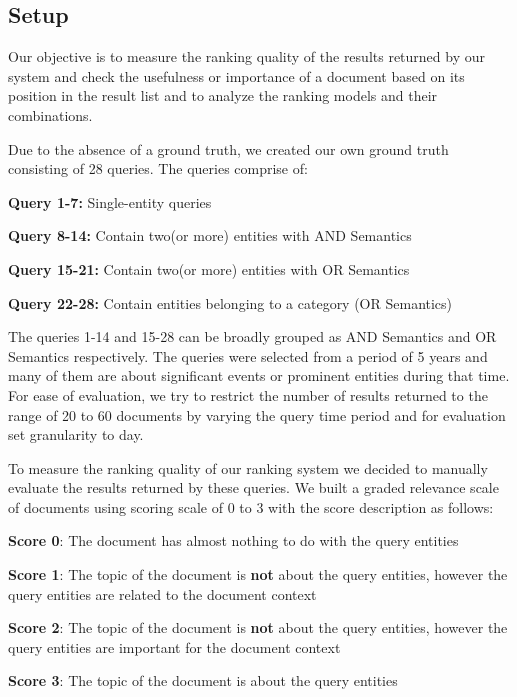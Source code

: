 
\subsection{Setup}
Our objective is to measure the ranking quality of the results
returned by our system and check the usefulness or importance
of a document based on its position in the result list and
to analyze the ranking models and their combinations.

\vskip 0.15in
\noindent Due to the absence of a ground truth, we created our own ground truth consisting of 28 queries. The queries comprise of:
\begin{compactitem}
\item   \textbf{Query 1-7:} Single-entity queries
\item   \textbf{Query 8-14:} Contain two(or more) entities with AND Semantics
\item   \textbf{Query 15-21:} Contain two(or more) entities with OR Semantics
\item   \textbf{Query 22-28:} Contain entities belonging to a category (OR Semantics)
\end{compactitem}
\vspace{0.5mm}
The queries 1-14 and 15-28 can be broadly grouped as AND Semantics and OR Semantics 
respectively. The queries were selected from a period of 5 years and many of them are 
about significant events or prominent entities during that time. 
For ease of evaluation, we try to restrict the number of results returned
to the range of 20 to 60 documents by varying the query time period and for evaluation 
set granularity to day.

\vskip 0.15in
\noindent To measure the ranking quality of our ranking system
we decided to manually evaluate the results returned
by these queries.
We built a graded relevance scale of documents using
scoring scale of 0 to 3 with the score description as follows:
\begin{compactitem}
\item   \textbf{Score 0}: The document has almost nothing to do with the query entities
\item   \textbf{Score 1}: The topic of the document is \textbf{not} about the query entities, however the query entities are related to the document context
\item   \textbf{Score 2}: The topic of the document is \textbf{not} about the query entities, however the query entities are important for the document context
\item   \textbf{Score 3}: The topic of the document is about the query entities 
\end{compactitem}
\vspace{0.5mm}


